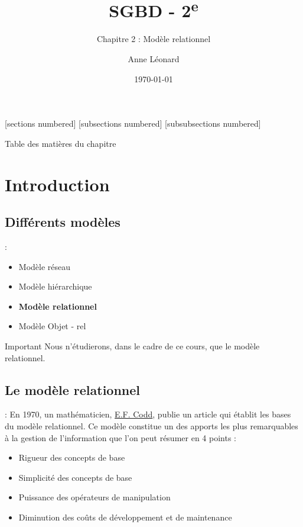 \documentclass[10pt]{beamer}
\title{SGBD - 2\textsuperscript{e}}
\subtitle{Chapitre 2 : Modèle relationnel}
\date{\today}
\author{Anne Léonard}
\institute{Haute École de la Province de Liège}
\begin{document}
\maketitle

[sections numbered]
[subsections numbered]
[subsubsections numbered]
\begin{frame}[allowframebreaks]{Table des matières du chapitre}
    \tableofcontents[subsectionstyle=show/show/hide,subsubsectionstyle=show/show/hide,]
\end{frame}

\section{Introduction}
\tocss

\subsection{Différents modèles}
\begin{frame}{\secname : \subsecname}
    \begin{itemize}
        \item Modèle réseau
        \item Modèle hiérarchique
        \item \textbf{Modèle relationnel}
        \item Modèle Objet - rel
    \end{itemize}
    \begin{alertblock}{Important}
        Nous n'étudierons, dans le cadre de ce cours, que le modèle relationnel.
    \end{alertblock}
\end{frame}

\subsection{Le modèle relationnel}
\begin{frame}{\secname : \subsecname}
    En 1970, un mathématicien, \href{https://fr.wikipedia.org/wiki/Edgar_Frank_Codd}{E.F. Codd}, publie un article qui établit les bases du modèle relationnel.
    Ce modèle constitue un des apports les plus remarquables à la gestion de l’information que l’on peut résumer en 4 points :
    \begin{itemize}
        \item Rigueur des concepts de base
        \item Simplicité des concepts de base
        \item Puissance des opérateurs de manipulation
        \item Diminution des coûts de développement et de maintenance
    \end{itemize}
\end{frame}
\end{document}
